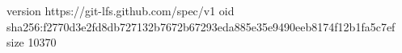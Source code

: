 version https://git-lfs.github.com/spec/v1
oid sha256:f2770d3e2fd8db727132b7672b67293eda885e35e9490eeb8174f12b1fa5c7ef
size 10370
